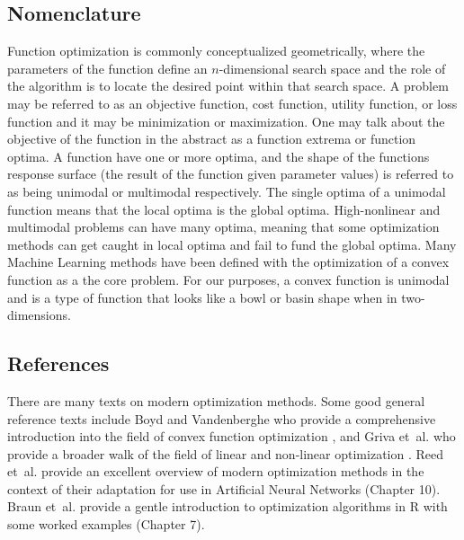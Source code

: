 \begin{bibunit}
\subsection{Nomenclature}
Function optimization is commonly conceptualized geometrically, where the parameters of the function define an $n$-dimensional search space and the role of the algorithm is to locate the desired point within that search space.
A problem may be referred to as an objective function, cost function, utility function, or loss function and it may be minimization or maximization. One may talk about the objective of the function in the abstract as a function extrema or function optima. 
A function have one or more optima, and the shape of the functions response surface (the result of the function given parameter values) is referred to as being unimodal or multimodal respectively. The single optima of a unimodal function means that the local optima is the global optima. High-nonlinear and multimodal problems can have many optima, meaning that some optimization methods can get caught in local optima and fail to fund the global optima.
Many Machine Learning methods have been defined with the optimization of a convex function as a the core problem. For our purposes, a convex function is unimodal and is a type of function that looks like a bowl or basin shape when in two-dimensions.

\subsection{References}
There are many texts on modern optimization methods. Some good general reference texts include Boyd and Vandenberghe  who provide a comprehensive introduction into the field of convex function optimization \cite{Boyd2004}, and Griva et~al. who provide a broader walk of the field of linear and non-linear optimization \cite{Griva2009}.
Reed et~al. provide an excellent overview of modern optimization methods in the context of their adaptation for use in Artificial Neural Networks \cite{Reed1998} (Chapter 10).
Braun et~al. provide a gentle introduction to optimization algorithms in R with some worked examples \cite{Braun2007} (Chapter 7).

\putbib
\end{bibunit}

